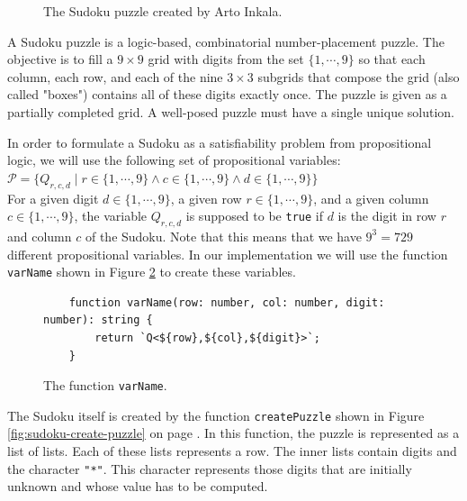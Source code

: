 \begin{figure}[!ht]
  \centering
  \caption{The Sudoku puzzle created by Arto Inkala.}
  \label{fig:sudoku.png}
\end{figure}

A Sudoku puzzle is a logic-based, combinatorial number-placement puzzle. The objective is to fill a
$9 \times 9$ grid with digits from the set $\{1, \cdots, 9\}$ so that each column, each row, and each of the
nine $3 \times 3$ subgrids that compose the grid (also called "boxes") contains all of these digits exactly
once.  The puzzle is given as a partially completed grid.  A well-posed puzzle must have a single unique
solution.

In order to formulate a Sudoku as a satisfiability problem from propositional logic, we will use the following
set of propositional variables:
\\[0.2cm]
\hspace*{1.3cm}
$\mathcal{P} = \bigl\{ Q_{r,c,d} \mid r \in \{1,\cdots, 9\} \wedge c \in \{1,\cdots, 9\} \wedge d \in \{1,\cdots, 9\} \bigl\}$
\\[0.2cm]
For a given digit $d \in \{1, \cdots, 9\}$, a given row $r \in \{1, \cdots, 9\}$, and a given column
$c \in \{1, \cdots, 9\}$, the variable $Q_{r,c,d}$ is supposed to be \texttt{true} if $d$ is the digit in
row $r$ and column $c$ of the Sudoku.  Note that this means that we have $9^3 = 729$ different propositional
variables.  In our implementation we will use the function \texttt{varName} shown in
Figure \ref{fig:sudoku-var} to create these variables.

\begin{figure}[!ht]
\centering
\begin{verbatim}
    function varName(row: number, col: number, digit: number): string {
        return `Q<${row},${col},${digit}>`;
    }
\end{verbatim}
\vspace*{-0.3cm}
\caption{The function \texttt{varName}.}
\label{fig:sudoku-var}
\end{figure} %

The Sudoku itself is created by the function \texttt{createPuzzle} shown in Figure
\ref{fig:sudoku-create-puzzle} on page \pageref{fig:sudoku-create-puzzle}.  In this function, the puzzle is
represented as a list of lists.  Each of these lists represents a row.  The inner lists contain digits and the
character \texttt{"*"}.  This character represents those digits that are initially unknown and whose value has
to be computed.

